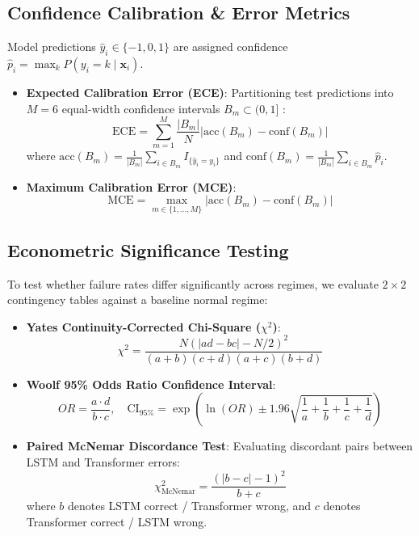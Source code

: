 \documentclass[10pt,twocolumn,letterpaper]{article}
\begin{document}
\subsection{Confidence Calibration \& Error Metrics}
Model predictions $\hat{y}_i \in \{-1, 0, 1\}$ are assigned confidence $\hat{p}_i = \max_k P(y_i = k \mid \mathbf{x}_i)$.
\begin{itemize}
    \item \textbf{Expected Calibration Error (ECE)}:
    Partitioning test predictions into $M=6$ equal-width confidence intervals $B_m \subset (0, 1]$ \cite{guo2017calibration}:
    \begin{equation}
        \text{ECE} = \sum_{m=1}^M \frac{|B_m|}{N} \left| \text{acc}(B_m) - \text{conf}(B_m) \right|
    \end{equation}
    where $\text{acc}(B_m) = \frac{1}{|B_m|} \sum_{i \in B_m} I_{\{\hat{y}_i = y_i\}}$ and $\text{conf}(B_m) = \frac{1}{|B_m|} \sum_{i \in B_m} \hat{p}_i$.
    \item \textbf{Maximum Calibration Error (MCE)}:
    \begin{equation}
        \text{MCE} = \max_{m \in \{1, \dots, M\}} \left| \text{acc}(B_m) - \text{conf}(B_m) \right|
    \end{equation}
\end{itemize}

\subsection{Econometric Significance Testing}
To test whether failure rates differ significantly across regimes, we evaluate $2 \times 2$ contingency tables against a baseline normal regime:
\begin{itemize}
    \item \textbf{Yates Continuity-Corrected Chi-Square ($\chi^2$)}:
    \begin{equation}
        \chi^2 = \frac{N (|ad - bc| - N/2)^2}{(a+b)(c+d)(a+c)(b+d)}
    \end{equation}
    \item \textbf{Woolf 95\% Odds Ratio Confidence Interval}:
    \begin{equation}
        OR = \frac{a \cdot d}{b \cdot c}, \quad \text{CI}_{95\%} = \exp\left(\ln(OR) \pm 1.96 \sqrt{\frac{1}{a} + \frac{1}{b} + \frac{1}{c} + \frac{1}{d}}\right)
    \end{equation}
    \item \textbf{Paired McNemar Discordance Test}:
    Evaluating discordant pairs between LSTM and Transformer errors:
    \begin{equation}
        \chi_{\text{McNemar}}^2 = \frac{(|b - c| - 1)^2}{b + c}
    \end{equation}
    where $b$ denotes LSTM correct / Transformer wrong, and $c$ denotes Transformer correct / LSTM wrong.
\end{itemize}
\end{document}
